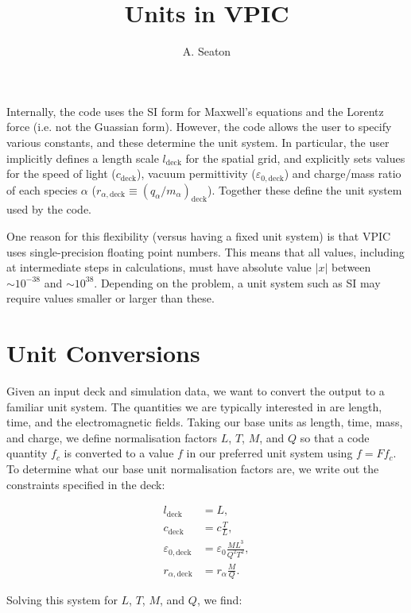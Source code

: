 \documentclass[twocolumn,10pt]{article}
\title{Units in VPIC}
\author{A. Seaton}
\begin{document}
	\maketitle

	Internally, the code uses the SI form for Maxwell's equations and the Lorentz force (i.e. not the Guassian form). However, the code allows the user to specify various constants, and these determine the unit system. In particular, the user implicitly defines a length scale $l_{\mathrm{deck}}$ for the spatial grid, and explicitly sets values for the speed of light ($c_{\mathrm{deck}}$), vacuum permittivity ($\varepsilon_{0,\mathrm{deck}}$) and charge/mass ratio of each species $\alpha$ ($r_{\alpha,\mathrm{deck}} \equiv (q_{\alpha}/m_{\alpha})_{\mathrm{deck}}$). Together these define the unit system used by the code.

	One reason for this flexibility (versus having a fixed unit system) is that VPIC uses single-precision floating point numbers. This means that all values, including at intermediate steps in calculations, must have absolute value $|x|$ between $\sim 10^{-38}$ and $\sim 10^{38}$. Depending on the problem, a unit system such as SI may require values smaller or larger than these.

	\section{Unit Conversions}

	Given an input deck and simulation data, we want to convert the output to a familiar unit system. The quantities we are typically interested in are length, time, and the electromagnetic fields. Taking our base units as length, time, mass, and charge, we define normalisation factors $L$, $T$, $M$, and $Q$ so that a code quantity $f_{c}$ is converted to a value $f$ in our preferred unit system using $f = Ff_c$. To determine what our base unit normalisation factors are, we write out the constraints specified in the deck:

	\begin{align}
		l_{\mathrm{deck}} &= L, \\
		c_{\mathrm{deck}} &= c\frac{T}{L}, \\
		\varepsilon_{0,\mathrm{deck}} &= \varepsilon_0\frac{ML^3}{Q^2T^2}, \\
		r_{\alpha,\mathrm{deck}} &= r_{\alpha}\frac{M}{Q}.
	\end{align}

	\noindent Solving this system for $L$, $T$, $M$, and $Q$, we find:
\end{document}
